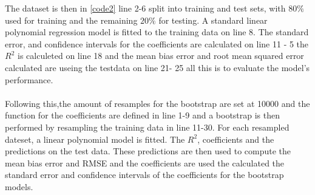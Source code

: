 


\noindent The dataset is then in \autoref{code2} line 2-6 split into training and test sets, with $80\%$ used for training and the remaining $20\%$ for testing. A standard linear polynomial regression model is fitted to the training data on line 8. The standard error, and confidence intervals for the coefficients are calculated on line 11 - 5 the $R^2$ is calculeted on line 18 and  the mean bias error and root mean squared error calculated are useing the testdata on line 21- 25 all this is to evaluate the model's performance.
\\\\



\noindent Following this,the amount of resamples for the bootstrap are set at 10000 and the function for the coefficients are defined in line 1-9 and a bootstrap is then performed by resampling the training data in line 11-30. For each resampled dateset, a linear polynomial model is fitted. The $R^2$, coefficients and the predictions on the test data. These predictions are then used to compute the mean bias error and RMSE and the coefficients are used the calculated the standard error and confidence intervals of the coefficients for the bootstrap models.
\\\\\\\\\\\\




